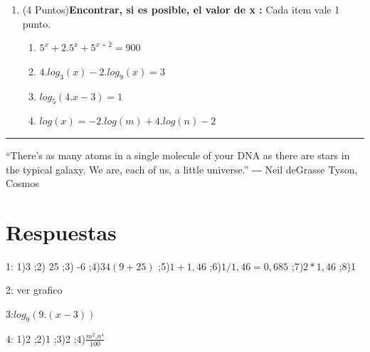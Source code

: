 \documentclass[a4paper, spanish]{exam}
\begin{document}
\begin{enumerate}
\begin{enumerate}
\end{enumerate}

\item (4 Puntos)\textbf{Encontrar, si es posible, el valor de x :}
Cada item vale 1 punto.
\begin{enumerate}
\item $5^x+2.5^x+5^{x+2}=900$
\item $4.log_3(x)-2.log_9(x)=3 $
\item $log_5(4.x-3)=1$
\item $log(x)=-2.log(m)+4.log(n)-2$
\end{enumerate}
  
 
 
 
\end{enumerate}
\rule[2ex]{\textwidth}{2pt}
 
“There’s as many atoms in a single molecule of your DNA as there are stars in the typical galaxy. We are, each of us, a little universe.”
― Neil deGrasse Tyson, Cosmos 

\newpage

\section*{Respuestas}
1: 1)3 ;2) 25 ;3) -6 ;4)$ 34 (9+25)$ ;5)$ 1+1,46 $ ;6)$ 1/1,46=0,685$ ;7)$2*1,46$ ;8)1

2: ver grafico

3:$log_9(9.(x-3))$

4: 1)2  ;2)1 ;3)2 ;4)$\frac{m^2.n^4}{100}$
\end{document}
